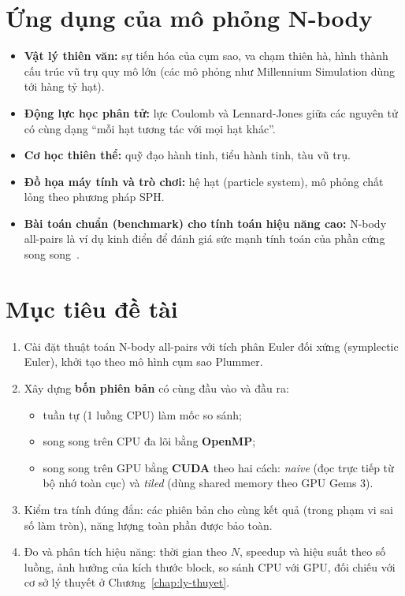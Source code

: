 \section{Ứng dụng của mô phỏng N-body}

\begin{itemize}
\item \textbf{Vật lý thiên văn:} sự tiến hóa của cụm sao, va chạm thiên hà, hình thành cấu trúc vũ trụ quy mô lớn (các mô phỏng như Millennium Simulation dùng tới hàng tỷ hạt).
\item \textbf{Động lực học phân tử:} lực Coulomb và Lennard-Jones giữa các nguyên tử có cùng dạng ``mỗi hạt tương tác với mọi hạt khác''.
\item \textbf{Cơ học thiên thể:} quỹ đạo hành tinh, tiểu hành tinh, tàu vũ trụ.
\item \textbf{Đồ họa máy tính và trò chơi:} hệ hạt (particle system), mô phỏng chất lỏng theo phương pháp SPH.
\item \textbf{Bài toán chuẩn (benchmark) cho tính toán hiệu năng cao:} N-body all-pairs là ví dụ kinh điển để đánh giá sức mạnh tính toán của phần cứng song song~\cite{gpugems3}.
\end{itemize}

\section{Mục tiêu đề tài}

\begin{enumerate}
\item Cài đặt thuật toán N-body all-pairs với tích phân Euler đối xứng (symplectic Euler), khởi tạo theo mô hình cụm sao Plummer.
\item Xây dựng \textbf{bốn phiên bản} có cùng đầu vào và đầu ra:
\begin{itemize}
\item tuần tự (1 luồng CPU) làm mốc so sánh;
\item song song trên CPU đa lõi bằng \textbf{OpenMP};
\item song song trên GPU bằng \textbf{CUDA} theo hai cách: \emph{naive} (đọc trực tiếp từ bộ nhớ toàn cục) và \emph{tiled} (dùng shared memory theo GPU Gems 3).
\end{itemize}
\item Kiểm tra tính đúng đắn: các phiên bản cho cùng kết quả (trong phạm vi sai số làm tròn), năng lượng toàn phần được bảo toàn.
\item Đo và phân tích hiệu năng: thời gian theo $N$, speedup và hiệu suất theo số luồng, ảnh hưởng của kích thước block, so sánh CPU với GPU, đối chiếu với cơ sở lý thuyết ở Chương~\ref{chap:ly-thuyet}.
\end{enumerate}

